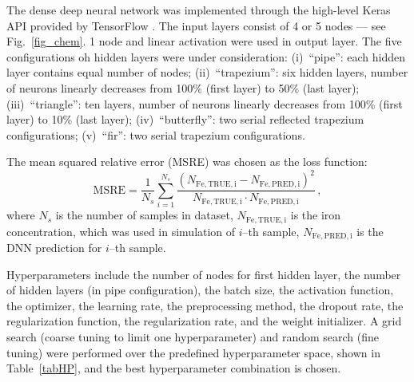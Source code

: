 \documentclass[a4paper,fleqn]{cas-sc}
\begin{document}
The dense deep neural network was implemented through the high-level Keras API provided by TensorFlow \cite{Keras}.
The input layers consist of 4 or 5 nodes --- see Fig.~\ref{fig_chem}.
1 node and linear activation were used in output layer.
The five configurations oh hidden layers were under consideration:
(i)~``pipe'': each hidden layer contains equal number of nodes;
(ii)~``trapezium'': six hidden layers, number of neurons linearly decreases from 100\% (first layer) to 50\% (last layer);
(iii)~``triangle'': ten layers, number of neurons linearly decreases from 100\% (first layer) to 10\% (last layer);
(iv)~``butterfly'': two serial reflected trapezium configurations;
(v)~``fir'': two serial trapezium configurations.

The mean squared relative error (MSRE) was chosen as the loss function:
\begin{equation}
\label{eqMSRE}
    \mathrm{MSRE}=\frac{1}{N_s}\sum_{i=1}^{N_s}\frac{(N_\mathrm{Fe,TRUE,i}-N_\mathrm{Fe,PRED,i})^2}{N_\mathrm{Fe,TRUE,i}\cdot N_\mathrm{Fe,PRED,i}}\,,
\end{equation}
where
$N_s$ is the number of samples in dataset,
$N_\mathrm{Fe,TRUE,i}$ is the iron concentration, which was used in simulation of $i$--th sample,
$N_\mathrm{Fe,PRED,i}$ is the DNN prediction for $i$--th sample.

Hyperparameters include the number of nodes for first hidden layer,
the number of hidden layers (in pipe configuration),
the batch size,
the activation function,
the optimizer,
the learning rate,
the preprocessing method,
the dropout rate,
the regularization function,
the regularization rate,
and the weight initializer.
A grid search (coarse tuning to limit one hyperparameter) and random search (fine tuning) were performed over the predefined hyperparameter space, shown in Table~\ref{tabHP}, and the best hyperparameter combination is chosen.
\end{document}
